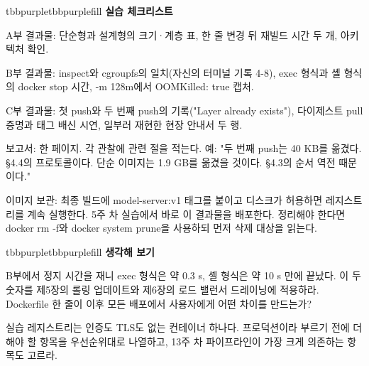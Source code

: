 \begin{calloutbox}{tbbpurple}{tbbpurplefill}
{\normalsize\bfseries\color{tbbpurple}실습 체크리스트}\par\vspace{3pt}
\begin{tbbitemize}
  \item A부 결과물: 단순형과 설계형의 크기·계층 표, 한 줄 변경 뒤 재빌드 시간 두 개, 아키텍처 확인.
  \item B부 결과물: inspect와 cgroupfs의 일치(자신의 터미널 기록 4-8), exec 형식과 셸 형식의 docker stop 시간, -m 128m에서 OOMKilled: true 캡처.
  \item C부 결과물: 첫 push와 두 번째 push의 기록("Layer already exists"), 다이제스트 pull 증명과 태그 배신 시연, 일부러 재현한 현장 안내서 두 행.
  \item 보고서: 한 페이지. 각 관찰에 관련 절을 적는다. 예: "두 번째 push는 40 KB를 옮겼다. §4.4의 프로토콜이다. 단순 이미지는 1.9 GB를 옮겼을 것이다. §4.3의 순서 역전 때문이다."
  \item 이미지 보관: 최종 빌드에 model-server:v1 태그를 붙이고 디스크가 허용하면 레지스트리를 계속 실행한다. 5주 차 실습에서 바로 이 결과물을 배포한다. 정리해야 한다면 docker rm -f와 docker system prune을 사용하되 먼저 삭제 대상을 읽는다.
\end{tbbitemize}
\end{calloutbox}

\vspace{3.0pt}

\begin{calloutbox}{tbbpurple}{tbbpurplefill}
{\normalsize\bfseries\color{tbbpurple}생각해 보기}\par\vspace{3pt}
\begin{tbbitemize}
  \item B부에서 정지 시간을 재니 exec 형식은 약 0.3 s, 셸 형식은 약 10 s 만에 끝났다. 이 두 숫자를 제5장의 롤링 업데이트와 제6장의 로드 밸런서 드레이닝에 적용하라. Dockerfile 한 줄이 이후 모든 배포에서 사용자에게 어떤 차이를 만드는가?
  \item 실습 레지스트리는 인증도 TLS도 없는 컨테이너 하나다. 프로덕션이라 부르기 전에 더해야 할 항목을 우선순위대로 나열하고, 13주 차 파이프라인이 가장 크게 의존하는 항목도 고르라.
\end{tbbitemize}
\end{calloutbox}



